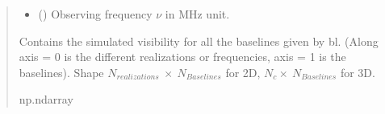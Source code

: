 \documentclass[a4paper,11pt,oneside,english,openany]{sphinxmanual}
\begin{document}
\begin{fulllineitems}
\begin{quote}
\begin{description}
\begin{itemize}
\item {} 
\sphinxAtStartPar
{} () \textendash{} Observing frequency \(\nu\) in \(\mathrm{MHz}\) unit.

\end{itemize}

\sphinxAtStartPar
{} \textendash{} Contains the simulated visibility for all the baselines given by bl. (Along axis = 0 is the different realizations or frequencies, axis = 1 is the baselines). Shape \(N_{realizations}\ \times\ N_{Baselines}\) for 2D, \(N_{c}\times \ N_{Baselines}\) for 3D.

\sphinxAtStartPar
np.ndarray

\end{description}\end{quote}

\clearpage

\end{fulllineitems}

\end{document}
